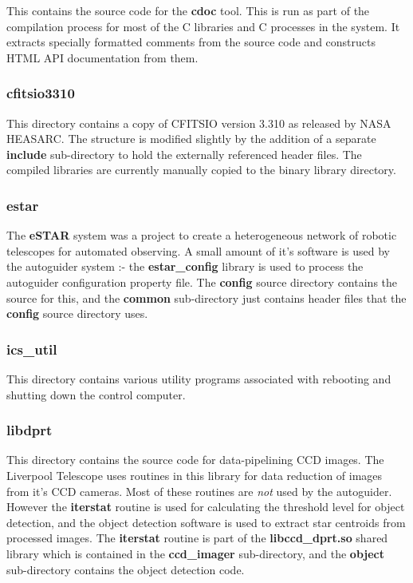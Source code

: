 \documentclass[10pt,a4paper]{article}
\begin{document}
This contains the source code for the {\bf cdoc} tool. This is run as part of the compilation process for most of the C libraries and C processes in the system. It extracts specially formatted comments from the source code and constructs HTML API documentation from them.

\subsubsection{cfitsio3310}

This directory contains a copy of CFITSIO version 3.310 as released by NASA HEASARC. The structure is modified slightly by the addition of a separate {\bf include} sub-directory to hold the externally referenced header files. The compiled libraries are currently manually copied to the binary library directory.

\subsubsection{estar}

The {\bf eSTAR} system was a project to create a heterogeneous network of robotic telescopes for automated observing. A small amount of it's software is used by the autoguider system :- the {\bf estar\_config} library is used to process the autoguider configuration property file. The {\bf config} source directory contains the source for this, and the {\bf common} sub-directory just contains header files that the {\bf config} source directory uses.

\subsubsection{ics\_util}

This directory contains various utility programs associated with rebooting and shutting down the control computer.

\subsubsection{libdprt}

This directory contains the source code for data-pipelining CCD images. The Liverpool Telescope uses routines in this library for data reduction of images from it's CCD cameras. Most of these routines are {\em not} used by the autoguider. However the {\bf iterstat} routine is used for calculating the threshold level for object detection, and the object detection software is used to extract star centroids from processed images. The {\bf iterstat} routine is part of the {\bf libccd\_dprt.so} shared library which is contained in the {\bf ccd\_imager} sub-directory, and the {\bf object} sub-directory contains the object detection code.
\end{document}
